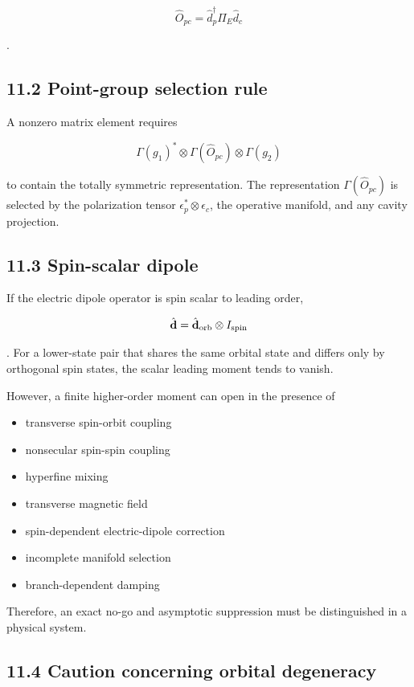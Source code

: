 \documentclass[
  10pt,
  a4paper,
]{article}
\providecommand{\tightlist}{%
  \setlength{\itemsep}{0pt}\setlength{\parskip}{0pt}}
\begin{document}
\[
\hat O_{pc}=\hat d_p^\dagger\Pi_E\hat d_c
\]

.

\subsection{11.2 Point-group selection
rule}\label{point-group-selection-rule}

A nonzero matrix element requires

\[
\Gamma(g_1)^*\otimes
\Gamma(\hat O_{pc})\otimes
\Gamma(g_2)
\]

to contain the totally symmetric representation. The representation
\(\Gamma(\hat O_{pc})\) is selected by the polarization tensor
\(\epsilon_p^*\otimes\epsilon_c\), the operative manifold, and any
cavity projection.

\subsection{11.3 Spin-scalar dipole}\label{spin-scalar-dipole}

If the electric dipole operator is spin scalar to leading order,

\[
\hat{\mathbf d}=\hat{\mathbf d}_{\rm orb}\otimes I_{\rm spin}
\]

. For a lower-state pair that shares the same orbital state and differs
only by orthogonal spin states, the scalar leading moment tends to
vanish.

However, a finite higher-order moment can open in the presence of

\begin{itemize}
\tightlist
\item
  transverse spin-orbit coupling
\item
  nonsecular spin-spin coupling
\item
  hyperfine mixing
\item
  transverse magnetic field
\item
  spin-dependent electric-dipole correction
\item
  incomplete manifold selection
\item
  branch-dependent damping
\end{itemize}

Therefore, an exact no-go and asymptotic suppression must be
distinguished in a physical system.

\subsection{11.4 Caution concerning orbital
degeneracy}\label{caution-concerning-orbital-degeneracy}
\end{document}
